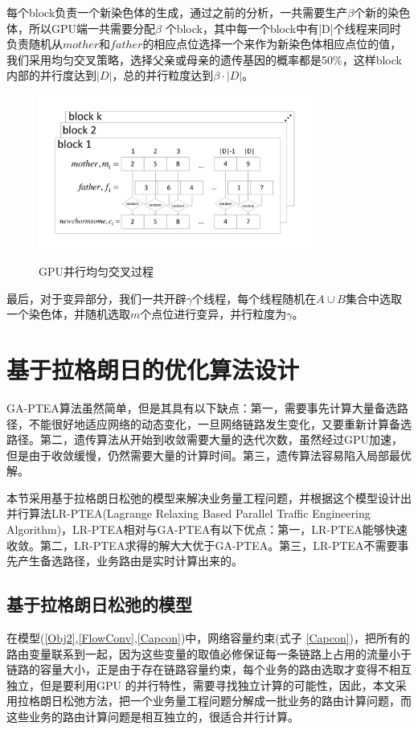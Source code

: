 每个block负责一个新染色体的生成，通过之前的分析，一共需要生产$\beta$个新的染色体，所以GPU端一共需要分配$\beta$ 个block，其中每一个block中有|D|个线程来同时负责随机从$mother$和$father$的相应点位选择一个来作为新染色体相应点位的值，我们采用均匀交叉策略，选择父亲或母亲的遗传基因的概率都是50\%，这样block内部的并行度达到$|D|$，总的并行粒度达到$\beta \cdot |D|$。
\begin{figure}
\vspace{-1cm}
\setlength{\abovecaptionskip}{-0.5cm}
\begin{center}
{\includegraphics[width=0.8\textwidth]{figures/GPUcross.pdf}}
\end{center}
\caption{{\footnotesize{GPU并行均匀交叉过程}}}
\label{cross}
\end{figure}


最后，对于变异部分，我们一共开辟$\gamma$个线程，每个线程随机在$A\cup B$集合中选取一个染色体，并随机选取$m$个点位进行变异，并行粒度为$\gamma$。
\section{基于拉格朗日的优化算法设计}

GA-PTEA算法虽然简单，但是其具有以下缺点：第一，需要事先计算大量备选路径，不能很好地适应网络的动态变化，一旦网络链路发生变化，又要重新计算备选路径。第二，遗传算法从开始到收敛需要大量的迭代次数，虽然经过GPU加速，但是由于收敛缓慢，仍然需要大量的计算时间。第三，遗传算法容易陷入局部最优解。

本节采用基于拉格朗日松弛的模型来解决业务量工程问题，并根据这个模型设计出并行算法LR-PTEA(Lagrange Relaxing Based Parallel Traffic Engineering Algorithm)，LR-PTEA相对与GA-PTEA有以下优点：第一，LR-PTEA能够快速收敛。第二，LR-PTEA求得的解大大优于GA-PTEA。第三，LR-PTEA不需要事先产生备选路径，业务路由是实时计算出来的。
\subsection{基于拉格朗日松弛的模型}
在模型(\ref{Obj2},\ref{FlowConv},\ref{Capcon})中，网络容量约束(式子 \ref{Capcon})，把所有的路由变量联系到一起，因为这些变量的取值必修保证每一条链路上占用的流量小于链路的容量大小，正是由于存在链路容量约束，每个业务的路由选取才变得不相互独立，但是要利用GPU 的并行特性，需要寻找独立计算的可能性，因此，本文采用拉格朗日松弛方法，把一个业务量工程问题分解成一批业务的路由计算问题，而这些业务的路由计算问题是相互独立的，很适合并行计算。

